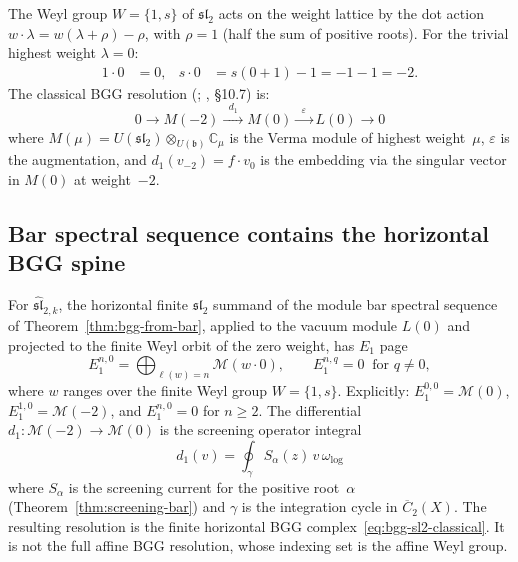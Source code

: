 \begin{computation}[BGG data for \texorpdfstring{$\mathfrak{sl}_2$}{sl_2}, \texorpdfstring{$\lambda = 0$}{lambda = 0}]
\label{comp:bgg-sl2-data}

The Weyl group $W = \{1, s\}$ of $\mathfrak{sl}_2$ acts on
the weight lattice by the dot action
$w \cdot \lambda = w(\lambda + \rho) - \rho$,
with $\rho = 1$ (half the sum of positive roots).
For the trivial highest weight $\lambda = 0$:
\begin{align*}
1 \cdot 0 &= 0, &
s \cdot 0 &= s(0 + 1) - 1 = -1 - 1 = -2.
\end{align*}
The classical BGG resolution
(\cite{BGG76}; \cite{Kac}, \S10.7) is:
\begin{equation}\label{eq:bgg-sl2-classical}
0 \longrightarrow M(-2) \xrightarrow{\;\;d_1\;\;}
M(0) \xrightarrow{\;\;\varepsilon\;\;}
L(0) \longrightarrow 0
\end{equation}
where $M(\mu) = U(\mathfrak{sl}_2) \otimes_{U(\mathfrak{b})}
\mathbb{C}_\mu$ is the Verma module of highest weight~$\mu$,
$\varepsilon$ is the augmentation, and
$d_1(v_{-2}) = f \cdot v_0$ is the embedding via the singular
vector in $M(0)$ at weight~$-2$.
\end{computation}


\subsection{Bar spectral sequence contains the horizontal BGG spine}

\begin{proposition}
\label{prop:bar-bgg-sl2}

For $\widehat{\mathfrak{sl}}_{2,k}$, the horizontal finite
$\mathfrak{sl}_2$ summand of the module bar spectral sequence of
Theorem~\textup{\ref{thm:bgg-from-bar}}, applied to the vacuum module
$L(0)$ and projected to the finite Weyl orbit of the zero weight, has
$E_1$ page
\begin{equation}\label{eq:bar-bgg-sl2-E1}
E_1^{n,0} = \bigoplus_{\ell(w) = n} \mathcal{M}(w \cdot 0),
\qquad E_1^{n,q} = 0 \;\;\text{for } q \neq 0,
\end{equation}
where $w$ ranges over the finite Weyl group
$W = \{1, s\}$. Explicitly:
$E_1^{0,0} = \mathcal{M}(0)$,
$E_1^{1,0} = \mathcal{M}(-2)$, and
$E_1^{n,0} = 0$ for $n \geq 2$.
The differential
$d_1\colon \mathcal{M}(-2) \to \mathcal{M}(0)$
is the screening operator integral
\begin{equation}\label{eq:bar-bgg-sl2-screening}
d_1(v) = \oint_{\gamma} S_\alpha(z)\, v\, \omega_{\log}
\end{equation}
where $S_\alpha$ is the screening current for the positive
root~$\alpha$ \textup{(}Theorem~\textup{\ref{thm:screening-bar})}
and $\gamma$ is the integration cycle in
$\overline{C}_2(X)$. The resulting resolution is the
finite horizontal BGG complex~\eqref{eq:bgg-sl2-classical}. It is
not the full affine BGG resolution, whose indexing set is the affine
Weyl group.
\end{proposition}

